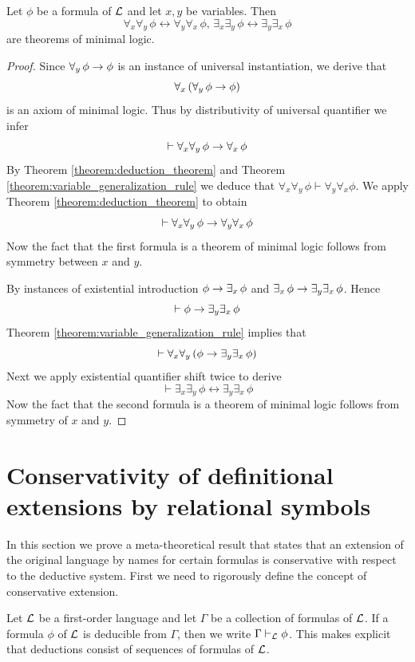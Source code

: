 \documentclass[10pt]{amsart}
\begin{document}
\begin{proposition}\label{proposition:commutativity_of_quantifiers}
  Let $\phi$ be a formula of ${\mathcal L}$ and let $x,y$ be variables. Then
  $$\forall_x\forall_y\,\phi \leftrightarrow \forall_y\forall_x\,\phi,\,\exists_x\exists_y\,\phi \leftrightarrow \exists_y\exists_x\,\phi$$
  are theorems of minimal logic.
\end{proposition}
\begin{proof}
  Since $\forall_y\,\phi \rightarrow \phi$ is an instance of universal instantiation, we derive that 
  $$\forall_x\left(\forall_y\,\phi \rightarrow \phi\right)$$
  is an axiom of minimal logic. Thus by distributivity of universal quantifier we infer 
  $$\vdash \forall_x\forall_y\,\phi \rightarrow \forall_x\,\phi$$
  By Theorem \ref{theorem:deduction_theorem} and Theorem \ref{theorem:variable_generalization_rule} we deduce that $\forall_x\forall_y\,\phi \vdash \forall_y\forall_x\phi$. We apply Theorem \ref{theorem:deduction_theorem} to obtain
  $$\vdash \forall_x\forall_y\,\phi \rightarrow \forall_y\forall_x\,\phi$$
  Now the fact that the first formula is a theorem of minimal logic follows from symmetry between $x$ and $y$.

  By instances of existential introduction $\phi \rightarrow \exists_x\,\phi$ and $\exists_x\,\phi \rightarrow \exists_y\exists_x\,\phi$. Hence
  $$\vdash \phi \rightarrow \exists_y\exists_x\,\phi$$
  Theorem \ref{theorem:variable_generalization_rule} implies that
  $$\vdash \forall_x\forall_y\left(\phi \rightarrow \exists_y\exists_x\,\phi\right)$$
  Next we apply existential quantifier shift twice to derive
  $$\vdash \exists_x\exists_y\,\phi \leftrightarrow \exists_y\exists_x\,\phi$$
  Now the fact that the second formula is a theorem of minimal logic follows from symmetry of $x$ and $y$.
\end{proof}

\section{Conservativity of definitional extensions by relational symbols}
\noindent
In this section we prove a meta-theoretical result that states that an extension of the original language by names for certain formulas is conservative with respect to the deductive system. First we need to rigorously define the concept of conservative extension.

Let ${\mathcal L}$ be a first-order language and let $\Gamma$ be a collection of formulas of ${\mathcal L}$. If a formula $\phi$ of ${\mathcal L}$ is deducible from $\Gamma$, then we write $\Gamma \vdash_{{\mathcal L}} \phi$. This makes explicit that deductions consist of sequences of formulas of ${\mathcal L}$.
\end{document}
